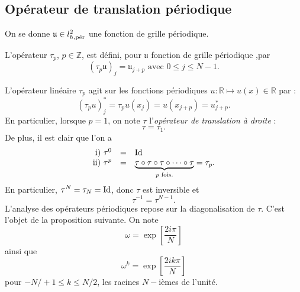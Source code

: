 \subsection{Opérateur de translation périodique}
On se donne $\mathfrak{u} \in l^2_{h,\per}$ une fonction de grille périodique.
\begin{definition}
L'opérateur $\tau_p$, $p \in \mathbb{Z}$, est défini, pour $\mathfrak{u}$ fonction de grille périodique ,par
\begin{equation}
(\tau_p \mathfrak{u})_j = \mathfrak{u}_{j+p} \text{ avec } 0 \leq j \leq N-1.
\end{equation}
\end{definition}
L'opérateur linéaire $\tau_p$ agit sur les fonctions périodiques $u : \mathbb{R} \mapsto u(x) \in \mathbb{R}$ par :
\begin{equation}
(\tau_p u)^*_j = \tau_p u(x_j) = u(x_{j+p}) = u^*_{j+p}.
\end{equation}
En particulier, lorsque $p=1$, on note $\tau$ l'\textit{opérateur de translation à droite} :
\begin{equation}
\tau = \tau_{1}.
\end{equation}
De plus, il est clair que l'on a
\begin{equation}
\begin{array}{rcl}
\text{i)   }\tau^0 & = & \Id\\
\text{ii)  }\tau^p & = & \underbrace{\tau \circ \tau \circ \tau \circ \cdots \circ \tau}_{p \text{ fois.}} = \tau_p.
\end{array}
\end{equation}
En particulier, $\tau^N = \tau_N = \Id$, donc $\tau$ est inversible et
\begin{equation}
\tau^{-1} = \tau^{N-1}.
\end{equation}
L'analyse des opérateurs périodiques repose sur la diagonalisation de $\tau$. C'est l'objet de la proposition suivante. On note
\begin{equation}
\omega = \exp \left[ \dfrac{2 i \pi}{N} \right]
\end{equation}
ainsi que
\begin{equation}
\omega^k = \exp \left[ \dfrac{2 i k \pi}{N} \right]
\end{equation}
pour $-N/+1 \leq k \leq N/2$, les racines $N-$ièmes de l'unité.
